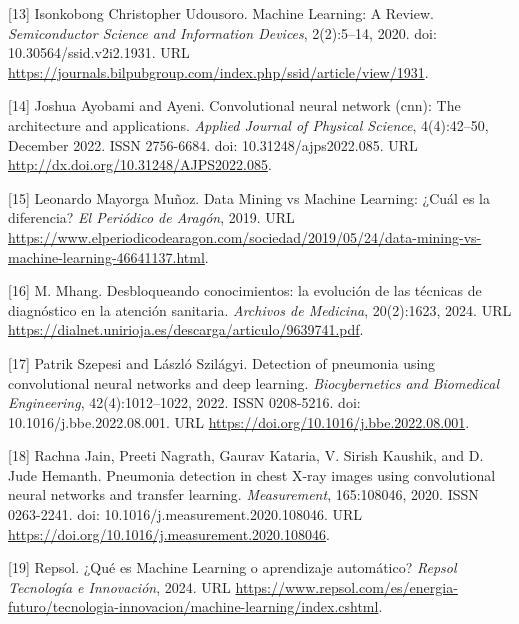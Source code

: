 \documentclass[11pt, a4paper]{article}
\numberwithin{equation}{section}
\begin{document}
\smallskip

\noindent \hypertarget{ref:13}{[13]} Isonkobong Christopher Udousoro. Machine Learning: A Review. \textit{Semiconductor Science and Information Devices}, 2(2):5--14, 2020. doi: 10.30564/ssid.v2i2.1931. URL \url{https://journals.bilpubgroup.com/index.php/ssid/article/view/1931}.

\smallskip

\noindent \hypertarget{ref:14}{[14]} Joshua Ayobami and Ayeni. Convolutional neural network (cnn): The architecture and applications. \textit{Applied Journal of Physical Science}, 4(4):42--50, December 2022. ISSN 2756-6684. doi: 10.31248/ajps2022.085. URL \url{http://dx.doi.org/10.31248/AJPS2022.085}.

\smallskip

\noindent \hypertarget{ref:15}{[15]} Leonardo Mayorga Muñoz. Data Mining vs Machine Learning: ¿Cuál es la diferencia? \textit{El Periódico de Aragón}, 2019. URL \url{https://www.elperiodicodearagon.com/sociedad/2019/05/24/data-mining-vs-machine-learning-46641137.html}.

\smallskip

\noindent \hypertarget{ref:16}{[16]} M. Mhang. Desbloqueando conocimientos: la evolución de las técnicas de diagnóstico en la atención sanitaria. \textit{Archivos de Medicina}, 20(2):1623, 2024. URL \url{https://dialnet.unirioja.es/descarga/articulo/9639741.pdf}.

\smallskip

\noindent \hypertarget{ref:17}{[17]} Patrik Szepesi and László Szilágyi. Detection of pneumonia using convolutional neural networks and deep learning. \textit{Biocybernetics and Biomedical Engineering}, 42(4):1012--1022, 2022. ISSN 0208-5216. doi: 10.1016/j.bbe.2022.08.001. URL \url{https://doi.org/10.1016/j.bbe.2022.08.001}.

\smallskip

\noindent \hypertarget{ref:18}{[18]} Rachna Jain, Preeti Nagrath, Gaurav Kataria, V. Sirish Kaushik, and D. Jude Hemanth. Pneumonia detection in chest X-ray images using convolutional neural networks and transfer learning. \textit{Measurement}, 165:108046, 2020. ISSN 0263-2241. doi: 10.1016/j.measurement.2020.108046. URL \url{https://doi.org/10.1016/j.measurement.2020.108046}.

\smallskip

\noindent \hypertarget{ref:19}{[19]} Repsol. ¿Qué es Machine Learning o aprendizaje automático? \textit{Repsol Tecnología e Innovación}, 2024. URL \url{https://www.repsol.com/es/energia-futuro/tecnologia-innovacion/machine-learning/index.cshtml}.
\end{document}
